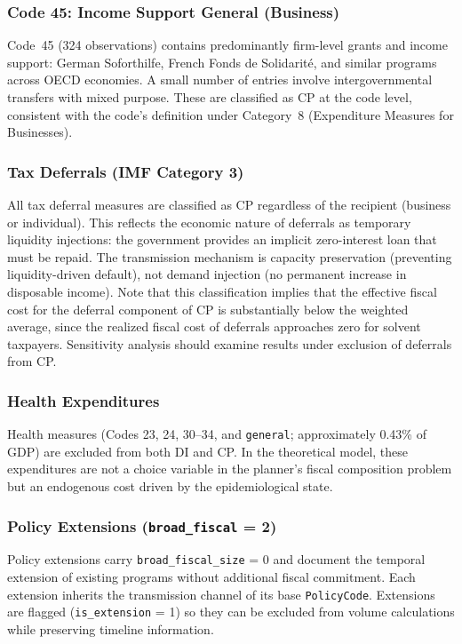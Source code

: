 \documentclass[12pt]{article}
\begin{document}
\subsubsection{Code 45: Income Support General (Business)}

Code~45 (324 observations) contains predominantly firm-level grants and income support: German Soforthilfe, French Fonds de Solidarit\'{e}, and similar programs across OECD economies. A small number of entries involve intergovernmental transfers with mixed purpose. These are classified as CP at the code level, consistent with the code's definition under Category~8 (Expenditure Measures for Businesses).

\subsubsection{Tax Deferrals (IMF Category 3)}

All tax deferral measures are classified as CP regardless of the recipient (business or individual). This reflects the economic nature of deferrals as temporary liquidity injections: the government provides an implicit zero-interest loan that must be repaid. The transmission mechanism is capacity preservation (preventing liquidity-driven default), not demand injection (no permanent increase in disposable income). Note that this classification implies that the effective fiscal cost for the deferral component of CP is substantially below the weighted average, since the realized fiscal cost of deferrals approaches zero for solvent taxpayers. Sensitivity analysis should examine results under exclusion of deferrals from CP.

\subsubsection{Health Expenditures}

Health measures (Codes 23, 24, 30--34, and \texttt{general}; approximately 0.43\% of GDP) are excluded from both DI and CP. In the theoretical model, these expenditures are not a choice variable in the planner's fiscal composition problem but an endogenous cost driven by the epidemiological state.

\subsubsection{Policy Extensions (\texttt{broad\_fiscal} = 2)}

Policy extensions carry \texttt{broad\_fiscal\_size} = 0 and document the temporal extension of existing programs without additional fiscal commitment. Each extension inherits the transmission channel of its base \texttt{PolicyCode}. Extensions are flagged (\texttt{is\_extension} = 1) so they can be excluded from volume calculations while preserving timeline information.
\end{document}

